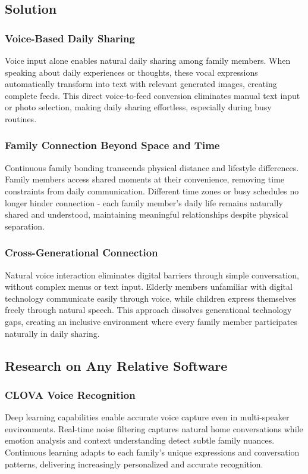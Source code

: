 \documentclass[conference]{IEEEtran}
\begin{document}
    \subsection{Solution}
        \subsubsection{Voice-Based Daily Sharing}
        Voice input alone enables natural daily sharing among family members. When speaking about daily experiences or thoughts, these vocal expressions automatically transform into text with relevant generated images, creating complete feeds. This direct voice-to-feed conversion eliminates manual text input or photo selection, making daily sharing effortless, especially during busy routines.

        \subsubsection{Family Connection Beyond Space and Time}
        Continuous family bonding transcends physical distance and lifestyle differences. Family members access shared moments at their convenience, removing time constraints from daily communication. Different time zones or busy schedules no longer hinder connection - each family member's daily life remains naturally shared and understood, maintaining meaningful relationships despite physical separation.

        \subsubsection{Cross-Generational Connection}
        Natural voice interaction eliminates digital barriers through simple conversation, without complex menus or text input. Elderly members unfamiliar with digital technology communicate easily through voice, while children express themselves freely through natural speech. This approach dissolves generational technology gaps, creating an inclusive environment where every family member participates naturally in daily sharing.

    \subsection{Research on Any Relative Software}
        \subsubsection{CLOVA Voice Recognition}
        Deep learning capabilities enable accurate voice capture even in multi-speaker environments. Real-time noise filtering captures natural home conversations while emotion analysis and context understanding detect subtle family nuances. Continuous learning adapts to each family's unique expressions and conversation patterns, delivering increasingly personalized and accurate recognition.
\end{document}
